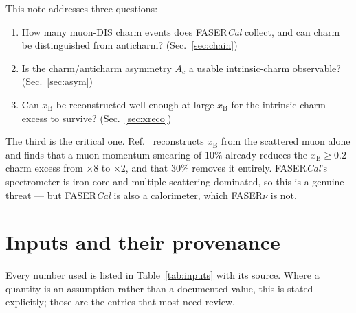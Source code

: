 \documentclass[11pt,a4paper]{article}
\newcommand{\xB}{x_{\mathrm{B}}}
\begin{document}
This note addresses three questions:
\begin{enumerate}
  \item How many muon-DIS charm events does FASER\emph{Cal} collect, and can
        charm be distinguished from anticharm? (Sec.~\ref{sec:chain})
  \item Is the charm/anticharm asymmetry $A_c$ a usable intrinsic-charm
        observable? (Sec.~\ref{sec:asym})
  \item Can $\xB$ be reconstructed well enough at large $\xB$ for the
        intrinsic-charm excess to survive? (Sec.~\ref{sec:xreco})
\end{enumerate}

The third is the critical one. Ref.~\cite{francener} reconstructs $\xB$ from the
scattered muon alone and finds that a muon-momentum smearing of $10\%$ already
reduces the $\xB\!\geq\!0.2$ charm excess from ${\times}8$ to ${\times}2$, and
that $30\%$ removes it entirely. FASER\emph{Cal}'s spectrometer is iron-core and
multiple-scattering dominated, so this is a genuine threat --- but FASER\emph{Cal}
is also a calorimeter, which FASER$\nu$ is not.

\section{Inputs and their provenance}
\label{sec:inputs}

Every number used is listed in Table~\ref{tab:inputs} with its source. Where a
quantity is an assumption rather than a documented value, this is stated
explicitly; those are the entries that most need review.
\end{document}
